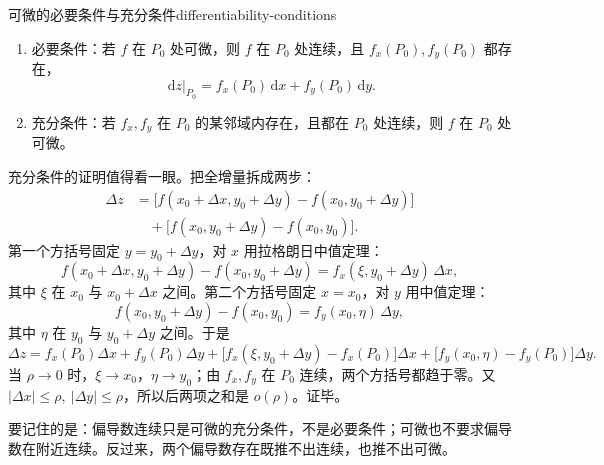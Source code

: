 \begin{conclusion}{可微的必要条件与充分条件}{differentiability-conditions}
    \begin{enumerate}
        \item 必要条件：若 \(f\) 在 \(P_0\) 处可微，则 \(f\) 在 \(P_0\) 处连续，且 \(f_x(P_0),f_y(P_0)\) 都存在，
        \[
            \mathrm{d}z\big|_{P_0}
            =f_x(P_0)\,\mathrm{d}x+f_y(P_0)\,\mathrm{d}y.
        \]
        \item 充分条件：若 \(f_x,f_y\) 在 \(P_0\) 的某邻域内存在，且都在 \(P_0\) 处连续，则 \(f\) 在 \(P_0\) 处可微。
    \end{enumerate}
\end{conclusion}

充分条件的证明值得看一眼。把全增量拆成两步：
\[
\begin{aligned}
    \Delta z
    &=\bigl[f(x_0+\Delta x,y_0+\Delta y)-f(x_0,y_0+\Delta y)\bigr]\\
    &\quad+\bigl[f(x_0,y_0+\Delta y)-f(x_0,y_0)\bigr].
\end{aligned}
\]
第一个方括号固定 \(y=y_0+\Delta y\)，对 \(x\) 用拉格朗日中值定理：
\[
    f(x_0+\Delta x,y_0+\Delta y)-f(x_0,y_0+\Delta y)
    =f_x(\xi,y_0+\Delta y)\,\Delta x,
\]
其中 \(\xi\) 在 \(x_0\) 与 \(x_0+\Delta x\) 之间。第二个方括号固定 \(x=x_0\)，对 \(y\) 用中值定理：
\[
    f(x_0,y_0+\Delta y)-f(x_0,y_0)
    =f_y(x_0,\eta)\,\Delta y,
\]
其中 \(\eta\) 在 \(y_0\) 与 \(y_0+\Delta y\) 之间。于是
\[
    \Delta z=f_x(P_0)\Delta x+f_y(P_0)\Delta y
    +\bigl[f_x(\xi,y_0+\Delta y)-f_x(P_0)\bigr]\Delta x
    +\bigl[f_y(x_0,\eta)-f_y(P_0)\bigr]\Delta y.
\]
当 \(\rho\to0\) 时，\(\xi\to x_0\)，\(\eta\to y_0\)；由 \(f_x,f_y\) 在 \(P_0\) 连续，两个方括号都趋于零。又 \(\lvert\Delta x\rvert\le\rho,\ \lvert\Delta y\rvert\le\rho\)，所以后两项之和是 \(o(\rho)\)。证毕。

要记住的是：偏导数连续只是可微的充分条件，不是必要条件；可微也不要求偏导数在附近连续。反过来，两个偏导数存在既推不出连续，也推不出可微。

